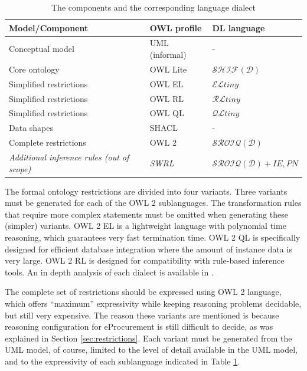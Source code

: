 	\begin{table}[!ht]
		\centering
		\begin{tabular}{@{}lll@{}}
			\toprule
			Model/Component         & OWL profile    & DL language \\ \midrule
			Conceptual model        & UML (informal) & -           \\
			Core ontology           & OWL Lite       & $\mathcal{SHIF(D)}$     \\
			Simplified restrictions & OWL EL         & $\mathcal{EL}tiny$      \\
			Simplified restrictions & OWL RL         & $\mathcal{RL}tiny$      \\
			Simplified restrictions & OWL QL         & $\mathcal{QL}tiny$      \\
			Data shapes             & SHACL          & -           \\
			Complete restrictions   & OWL 2          & $\mathcal{SROIQ(D)}$    \\
			\textit{Additional inference rules (out of scope)} & \textit{SWRL} & \textit{$\mathcal{SROIQ(D)} + IE, PN$} \\ \bottomrule
		\end{tabular}
		\caption{The components and the corresponding language dialect}
		\label{tab:expressivity}
	\end{table}
	
	The formal ontology restrictions are divided into four variants. Three variants must be generated for each of the OWL 2 sublanguages. The transformation rules that require more complex statements must be omitted when generating these (simpler) variants. OWL 2 EL is a lightweight language with polynomial time reasoning, which guarantees very fast termination time. OWL 2 QL is specifically designed for efficient database integration where the amount of instance data is very large. OWL 2 RL is designed for compatibility with rule-based inference tools. An in depth analysis of each dialect is available in \citep{krotzsch2012owl}.
		
	The complete set of restrictions should be expressed using OWL 2 language, which offers ``maximum'' expressivity while keeping reasoning problems decidable, but still very expensive. The reason these variants are mentioned is because reasoning configuration for eProcurement is still difficult to decide, as was explained in Section \ref{sec:restrictions}. Each variant must be generated from the UML model, of course, limited to the level of detail available in the UML model, and to the expressivity of each sublanguage indicated in Table \ref{tab:expressivity}.
	

